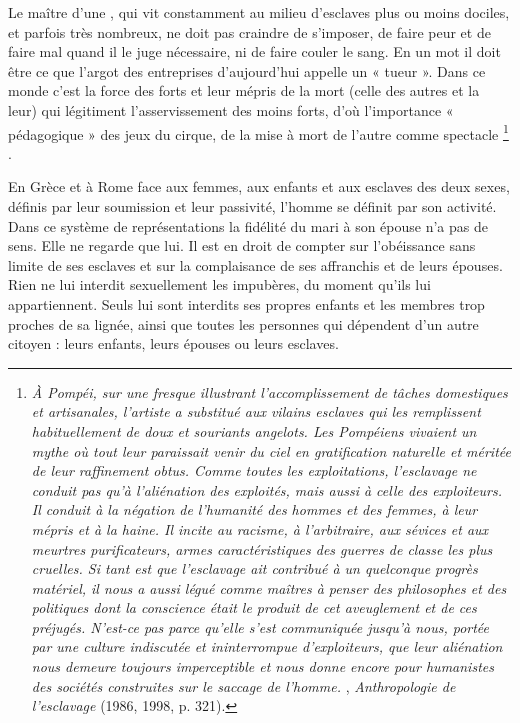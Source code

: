 Le maître d'une , qui vit constamment au milieu d'esclaves plus ou moins dociles, et parfois très nombreux, ne doit pas craindre de s'imposer, de faire peur et de faire mal quand il le juge nécessaire, ni de faire couler le sang. En un mot il doit être ce que l'argot des entreprises d'aujourd'hui appelle un « tueur ». Dans ce monde c'est la force des forts et leur mépris de la mort (celle des autres et la leur) qui légitiment l'asservissement des moins forts, d'où l'importance « pédagogique » des jeux du cirque, de la mise à mort de l'autre comme spectacle%
\footnote{\emph{À Pompéi, sur une fresque illustrant l'accomplissement de tâches domestiques et artisanales, l'artiste a substitué aux vilains esclaves qui les remplissent habituellement de doux et souriants angelots. Les Pompéiens vivaient un mythe où tout leur paraissait venir du ciel en gratification naturelle et méritée de leur raffinement obtus. Comme toutes les exploitations, l'esclavage ne conduit pas qu'à l'aliénation des exploités, mais aussi à celle des exploiteurs. Il conduit à la négation de l'humanité des hommes et des femmes, à leur mépris et à la haine. Il incite au racisme, à l'arbitraire, aux sévices et aux meurtres purificateurs, armes caractéristiques des guerres de classe les plus cruelles. Si tant est que l'esclavage ait contribué à un quelconque progrès matériel, il nous a aussi légué comme maîtres à penser des philosophes et des politiques dont la conscience était le produit de cet aveuglement et de ces préjugés. N'est-ce pas parce qu'elle s'est communiquée jusqu'à nous, portée par une culture indiscutée et ininterrompue d'exploiteurs, que leur aliénation nous demeure toujours imperceptible et nous donne encore pour humanistes des sociétés construites sur le saccage de l'homme.} , \emph{Anthropologie de l'esclavage} (1986, 1998, p. 321).}%
.

 En Grèce et à Rome face aux femmes, aux enfants et aux esclaves des deux sexes, définis par leur soumission et leur passivité, l'homme se définit par son activité. Dans ce système de représentations la fidélité du mari à son épouse n'a pas de sens. Elle ne regarde que lui. Il est en droit de compter sur l'obéissance sans limite de ses esclaves et sur la complaisance de ses affranchis et de leurs épouses. Rien ne lui interdit sexuellement les impubères, du moment qu'ils lui appartiennent. Seuls lui sont interdits ses propres enfants et les membres trop proches de sa lignée, ainsi que toutes les personnes qui dépendent d'un autre citoyen : leurs enfants, leurs épouses ou leurs esclaves.

